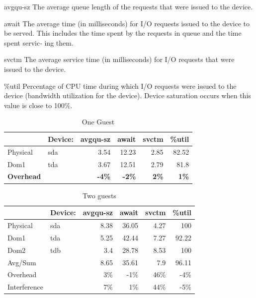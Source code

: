 \begin{description}
	\item{avgqu-sz} The average queue length of the requests that were issued to the device.
	\item{await} The average  time  (in  milliseconds)  for  I/O  requests issued to the device to be served. This includes the time spent by the requests in queue and the time spent servic‐ ing them.
	\item{svctm} The  average  service  time  (in  milliseconds)  for  I/O requests that were issued to the device. 
	\item{\%util} Percentage of CPU time during  which  I/O  requests  were issued  to  the  device  (bandwidth  utilization  for the device). Device saturation  occurs  when  this  value  is close to 100\%.
\end{description}

\begin{table}[htbp]
\begin{tabular}{|l|l|r|r|r|r|}
\hline
 & Device: & \multicolumn{1}{l|}{avgqu-sz} & \multicolumn{1}{l|}{await} & \multicolumn{1}{l|}{svctm} & \multicolumn{1}{l|}{\%util} \\ \hline
Physical & sda & 3.54 & 12.23 & 2.85 & 82.52 \\ \hline
Dom1 & tda & 3.67 & 12.51 & 2.79 & 81.8 \\ \hline
\textbf{Overhead} & \textbf{} & \textbf{-4\%} & \textbf{-2\%} & \textbf{2\%} & \textbf{1\%} \\ \hline
\end{tabular}
\caption{One Guest}
\label{1guest}
\end{table}

\begin{table}[htbp]
\begin{tabular}{|l|l|r|r|r|r|}
\hline
 & Device: & \multicolumn{1}{l|}{avgqu-sz} & \multicolumn{1}{l|}{await} & \multicolumn{1}{l|}{svctm} & \multicolumn{1}{l|}{\%util} \\ \hline
Physical & sda & 8.38 & 36.05 & 4.27 & 100 \\ \hline
Dom1 & tda & 5.25 & 42.44 & 7.27 & 92.22 \\ \hline
Dom2 & tdb & 3.4 & 28.78 & 8.53 & 100 \\ \hline
Avg/Sum &  & 8.65 & 35.61 & 7.9 & 96.11 \\ \hline
Overhead &  & 3\% & -1\% & 46\% & -4\% \\ \hline
Interference &  & 7\% & 1\% & 44\% & -5\% \\ \hline
\end{tabular}
\caption{Two guests}
\label{2guest}
\end{table}

